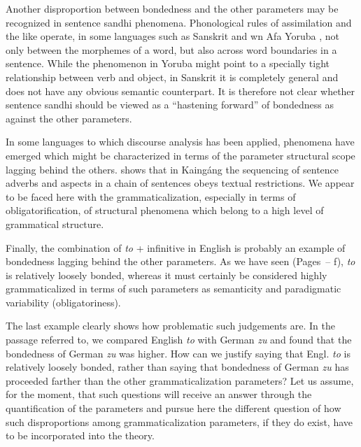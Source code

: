 Another disproportion between bondedness and the other parameters may be recognized in sentence sandhi phenomena. Phonological rules of assimilation and the like operate, in some languages such as Sanskrit and wn Afa Yoruba \citep[26f]{HeineEtAl1984}, not only between the morphemes of a word, but also across word boundaries in a sentence. While the phenomenon in Yoruba might point to a specially tight relationship between verb and object, in Sanskrit it is completely general and does not have any obvious semantic counterpart. It is therefore not clear whether sentence sandhi should be viewed as a “hastening forward” of bondedness as against the other parameters.

In some languages to which discourse analysis has been applied, phenomena have emerged which might be characterized in terms of the parameter structural scope lagging behind the others. \citet{Wiesemann1980} shows that in Kaingáng the sequencing of sentence adverbs and aspects in a chain of sentences obeys textual restrictions. We appear to be faced here with the grammaticalization, especially in terms of obligatorification, of structural phenomena which belong to a high level of grammatical structure.

Finally, the combination of \textit{to} + infinitive in English is probably an example of bondedness lagging behind the other parameters. As we have seen (Pages~\pageref{page161}--\pageref{page161b}\chk%
f), \textit{to} is relatively loosely bonded, whereas it must certainly be considered highly grammaticalized in terms of such parameters as semanticity and paradigmatic variability (obligatoriness).

The last example clearly shows how problematic such judgements are. In the passage referred to, we compared English \textit{to} with German \textit{zu} and found that the bondedness of German \textit{zu} was higher. How can we justify saying that Engl. \textit{to} is relatively loosely bonded, rather than saying that bondedness of German \textit{zu} has proceeded farther than the other grammaticalization parameters? Let us assume, for the moment, that such questions will receive an answer through the quantification of the parameters and pursue here the different question of how such disproportions among grammaticalization parameters, if they do exist, have to be incorporated into the theory.


